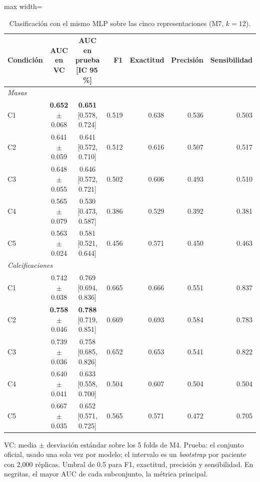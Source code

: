 \begin{table}[H]
\centering
\small
\caption{Clasificación con el mismo MLP sobre las cinco representaciones (M7, $k = 12$).}
\label{tab:m7_clasificacion}
\begin{adjustbox}{max width=\linewidth}
\begin{tabular}{l c c r r r r}
\toprule
Condición & AUC en VC & AUC en prueba [IC 95\,\%] & F1 & Exactitud & Precisión & Sensibilidad \\
\midrule
\multicolumn{7}{l}{\textit{Masas}} \\
\quad C1 & \textbf{0.652} $\pm$ 0.068 & \textbf{0.651} [0.578, 0.724] & 0.519 & 0.638 & 0.536 & 0.503 \\
\quad C2 & 0.641 $\pm$ 0.059 & 0.641 [0.572, 0.710] & 0.512 & 0.616 & 0.507 & 0.517 \\
\quad C3 & 0.648 $\pm$ 0.055 & 0.646 [0.572, 0.721] & 0.502 & 0.606 & 0.493 & 0.510 \\
\quad C4 & 0.565 $\pm$ 0.079 & 0.530 [0.473, 0.587] & 0.386 & 0.529 & 0.392 & 0.381 \\
\quad C5 & 0.563 $\pm$ 0.024 & 0.581 [0.521, 0.644] & 0.456 & 0.571 & 0.450 & 0.463 \\
\multicolumn{7}{l}{\textit{Calcificaciones}} \\
\quad C1 & 0.742 $\pm$ 0.038 & 0.769 [0.694, 0.836] & 0.665 & 0.666 & 0.551 & 0.837 \\
\quad C2 & \textbf{0.758} $\pm$ 0.046 & \textbf{0.788} [0.719, 0.851] & 0.669 & 0.693 & 0.584 & 0.783 \\
\quad C3 & 0.739 $\pm$ 0.036 & 0.758 [0.685, 0.826] & 0.652 & 0.653 & 0.541 & 0.822 \\
\quad C4 & 0.640 $\pm$ 0.041 & 0.633 [0.558, 0.700] & 0.504 & 0.607 & 0.504 & 0.504 \\
\quad C5 & 0.667 $\pm$ 0.035 & 0.652 [0.571, 0.725] & 0.565 & 0.571 & 0.472 & 0.705 \\
\bottomrule
\end{tabular}
\end{adjustbox}
\par\smallskip
\parbox{0.95\linewidth}{\footnotesize VC: media $\pm$ desviación estándar sobre los 5 folds de M4. Prueba: el conjunto oficial, usado una sola vez por modelo; el intervalo es un \textit{bootstrap} por paciente con 2{,}000 réplicas. Umbral de 0.5 para F1, exactitud, precisión y sensibilidad. En negritas, el mayor AUC de cada subconjunto, la métrica principal.}
\end{table}
